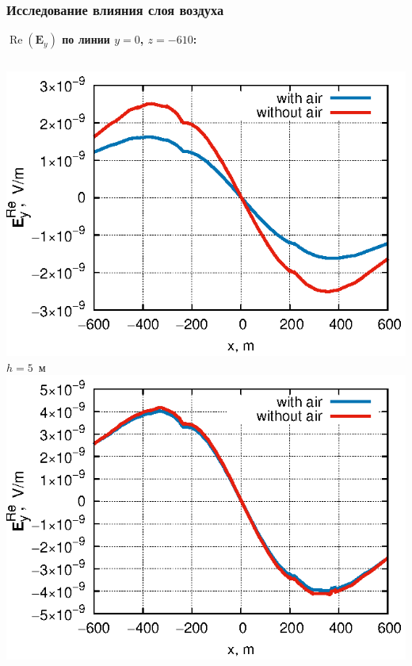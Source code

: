 \documentclass[aspectratio=43,usepdftitle=false]{beamer}
\renewcommand{\Re}{\mathop{\mathrm{Re}}\nolimits}
\newcommand{\MakeTitle}[1]{\frametitle{\hspace{1.5em}\textbf{#1} \hfill \insertframenumber{} }}
\begin{document}
\begin{frame}
	\MakeTitle{Исследование влияния слоя воздуха}
	\textbf{$\Re(\mathbf{E}_y)$ по линии $y=0$, $z=-610$:}
	\begin{columns}[t,totalwidth=\linewidth]
		\begin{column}{.5\linewidth}
			\vspace{-1.7em}
			\begin{center}
			\includegraphics[width=\textwidth,height=0.4\textheight,keepaspectratio]{deep_-5.eps} \\
			\vspace{-0.1em}
			\tiny{$h=5$~м} \\
			\includegraphics[width=\textwidth,height=0.4\textheight,keepaspectratio]{deep_-200.eps} \\
			\vspace{-0.1em}

\end{center}
\end{column}
\end{columns}
\end{frame}
\end{document}
